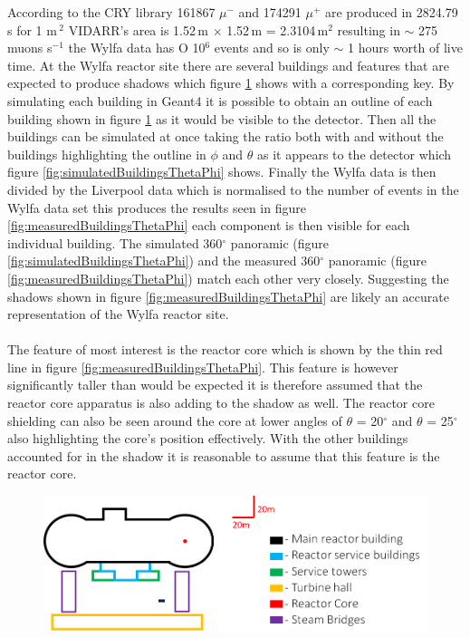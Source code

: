 \documentclass[12pt,a4paper]{article}
\begin{document}
According to the CRY library \cite{ieee_cry_2007} 161867 $\mu^-$ and 174291 $\mu^+$ are produced in 2824.79\,s for 1 m\,$^2$ VIDARR's area is 1.52\,m $\times$ 1.52\,m = 2.3104\,m$^2$ resulting in $\sim$ 275 muons s$^{-1}$ the Wylfa data has O 10$^6$ events and so is only $\sim$ 1 hours worth of live time. At the Wylfa reactor site there are several buildings and features that are expected to produce shadows which figure \ref{fig:wylfaTraceOfBuildings} shows with a corresponding key. By simulating each building in Geant4 it is possible to obtain an outline of each building shown in figure \ref{fig:wylfaTraceOfBuildings} as it would be visible to the detector. Then all the buildings can be simulated at once taking the ratio both with and without the buildings highlighting the outline in $\phi$ and $\theta$ as it appears to the detector which figure \ref{fig:simulatedBuildingsThetaPhi} shows. Finally the Wylfa data is then divided by the Liverpool data which is normalised to the number of events in the Wylfa data set this produces the results seen in figure \ref{fig:measuredBuildingsThetaPhi} each component is then visible for each individual building. The simulated 360$^\circ$ panoramic (figure \ref{fig:simulatedBuildingsThetaPhi}) and the measured 360$^\circ$ panoramic (figure \ref{fig:measuredBuildingsThetaPhi}) match each other very closely. Suggesting the shadows shown in figure \ref{fig:measuredBuildingsThetaPhi} are likely an accurate representation of the Wylfa reactor site.
\\\\The feature of most interest is the reactor core which is shown by the thin red line in figure \ref{fig:measuredBuildingsThetaPhi}. This feature is however significantly taller than would be expected it is therefore assumed that the reactor core apparatus is also adding to the shadow as well. The reactor core shielding can also be seen around the core at lower angles of $\theta$ = 20$^\circ$ and $\theta$ = 25$^\circ$ also highlighting the core's position effectively. With the other buildings accounted for in the shadow it is reasonable to assume that this feature is the reactor core. 

\begin{figure}[H]
 \centering
 \includegraphics[width=1.0\linewidth]{wylfaReactorBuildings/wylfaTrace+key.png}
 \label{fig:wylfaTraceOfBuildings}
\end{figure}
\end{document}
